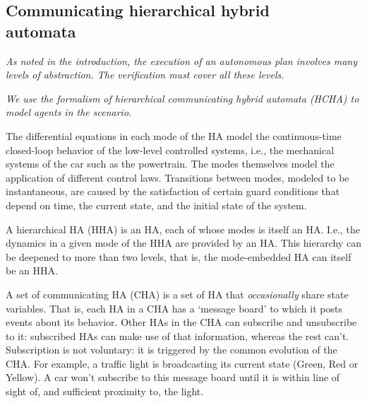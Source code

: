 \subsection{Communicating hierarchical hybrid \\automata}
\label{HCHA}
{\it As noted in the introduction, the execution of an autonomous plan involves many levels of abstraction. The verification must cover all these levels.}

{\it We use the formalism of hierarchical communicating hybrid automata (HCHA) to model agents in the scenario. }

\begin{defn}
	
	\end{defn}
	
The differential equations in each mode of the HA model the continuous-time closed-loop behavior of the low-level controlled systems, i.e., the mechanical systems of the car such as the powertrain. 
The modes themselves model the application of different control laws. 
Transitions between modes, modeled to be instantaneous, are caused by the satisfaction of certain guard conditions that depend on time, the current state, and the initial state of the system.

\begin{defn}
	
\end{defn}
A hierarchical HA (HHA) is an HA, each of whose modes is itself an HA.
I.e., the dynamics in a given mode of the HHA are provided by an HA.
This hierarchy can be deepened to more than two levels, that is, the mode-embedded HA can itself be an HHA.


\begin{defn}
	
\end{defn}
A set of communicating HA (CHA) is a set of HA that \emph{occasionally} share state variables.
That is, each HA in a CHA has a `message board' to which it posts events about its behavior.
Other HAs in the CHA can subscribe and unsubscribe to it: 
subscribed HAs can make use of that information, whereas the rest can't. 
Subscription is not voluntary: it is triggered by the common evolution of the CHA.
For example, a traffic light is broadcasting its current state (Green, Red or Yellow).
A car won't subscribe to this message board until it is within line of sight of, and sufficient proximity to, the light.


